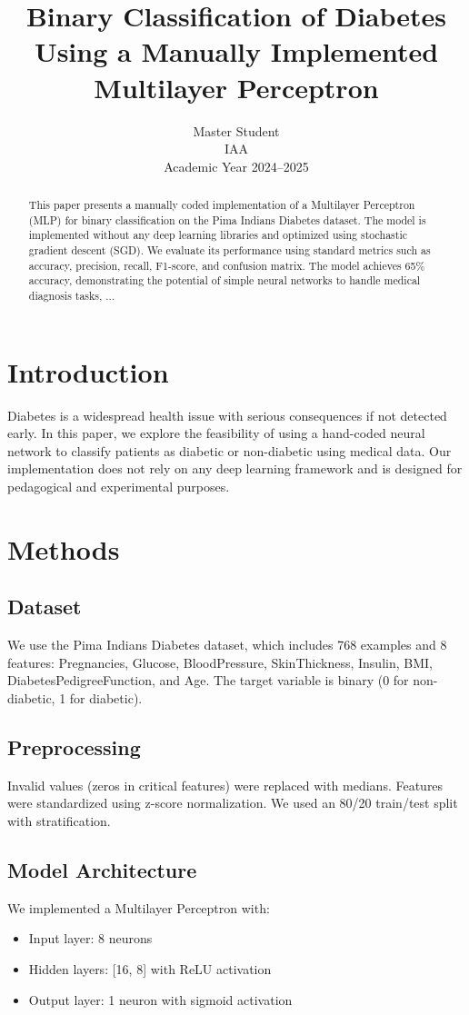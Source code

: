 \documentclass[12pt]{article}
\title{Binary Classification of Diabetes Using a Manually Implemented Multilayer Perceptron}
\author{Master Student \\ IAA \\ Academic Year 2024--2025}
\date{}
\begin{document}
\maketitle

\begin{abstract}
This paper presents a manually coded implementation of a Multilayer Perceptron (MLP) for binary classification on the Pima Indians Diabetes dataset. The model is implemented without any deep learning libraries and optimized using stochastic gradient descent (SGD). We evaluate its performance using standard metrics such as accuracy, precision, recall, F1-score, and confusion matrix. The model achieves 65\% accuracy, demonstrating the potential of simple neural networks to handle medical diagnosis tasks, ...
\end{abstract}

\section{Introduction}
Diabetes is a widespread health issue with serious consequences if not detected early. In this paper, we explore the feasibility of using a hand-coded neural network to classify patients as diabetic or non-diabetic using medical data. Our implementation does not rely on any deep learning framework and is designed for pedagogical and experimental purposes.

\section{Methods}
\subsection{Dataset}
We use the Pima Indians Diabetes dataset, which includes 768 examples and 8 features: Pregnancies, Glucose, BloodPressure, SkinThickness, Insulin, BMI, DiabetesPedigreeFunction, and Age. The target variable is binary (0 for non-diabetic, 1 for diabetic).

\subsection{Preprocessing}
Invalid values (zeros in critical features) were replaced with medians. Features were standardized using z-score normalization. We used an 80/20 train/test split with stratification.

\subsection{Model Architecture}
We implemented a Multilayer Perceptron with:
\begin{itemize}
    \item Input layer: 8 neurons
    \item Hidden layers: [16, 8] with ReLU activation
    \item Output layer: 1 neuron with sigmoid activation
\end{itemize}
\end{document}
